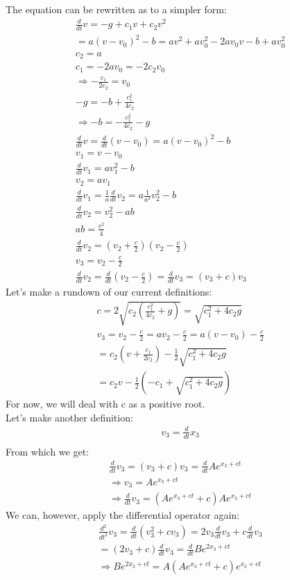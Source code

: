 \documentclass[english,a4paper,oneside,article,9pt]{memoir}
\begin{document}
The equation can be rewritten as to a simpler form:
\begin{align*}
\frac{d}{dt}v=-g+c_1v+c_2v^2\\
=a(v-v_0)^2-b=av^2+av_0^2-2av_0v-b+av_0^2\\
c_2=a\\
c_1=-2av_0=-2c_2v_0\\
\Rightarrow -\frac{c_1}{2c_2}=v_0\\
-g=-b+\frac{c_1^2}{4c_2}\\
\Rightarrow -b=-\frac{c_1^2}{4c_2}-g\\
\frac{d}{dt} v=\frac{d}{dt}(v-v_0)=a(v-v_0)^2-b\\
v_1=v-v_0\\
\frac{d}{dt} v_1=av_1^2-b\\
v_2=av_1\\
\frac{d}{dt} v_1=\frac{1}{a}\frac{d}{dt} v_2=a\frac{1}{a^2}v_2^2-b\\
\frac{d}{dt} v_2=v_2^2-ab\\
ab=\frac{c^2}{4}\\
\frac{d}{dt} v_2=(v_2+\frac{c}{2})(v_2-\frac{c}{2})\\
v_3=v_2-\frac{c}{2}\\
\frac{d}{dt} v_2=\frac{d}{dt}(v_2-\frac{c}{2})=\frac{d}{dt} v_3=(v_3+c)v_3
\end{align*}
Let's make a rundown of our current definitions:
\begin{align*}
c=2\sqrt{c_2(\frac{c_1^2}{4c_2}+g)}=\sqrt{c_1^2+4c_2g}\\
v_3=v_2-\frac{c}{2}=av_2-\frac{c}{2}=a(v-v_0)-\frac{c}{2}\\
=c_2(v+\frac{c_1}{2c_2})-\frac{1}{2}\sqrt{c_1^2+4c_2g}\\
=c_2v-\frac{1}{2}(-c_1+\sqrt{c_1^2+4c_2g})
\end{align*}
For now, we will deal with c as a positive root.\\
Let's make another definition:
\begin{align*}
v_3=\frac{d}{dt}x_3\tag{$x_3$ is transformed position}\\
\end{align*}
From which we get:
\begin{align*}
\frac{d}{dt} v_3=(v_3+c)v_3=\frac{d}{dt}Ae^{x_3+ct}\\
\Rightarrow v_3=Ae^{x_3+ct}\\
\Rightarrow \frac{d}{dt} v_3=(Ae^{x_3+ct}+c)Ae^{x_3+ct}
\end{align*}
We can, however, apply the differential operator again:
\begin{align*}
\frac{d^2}{dt^2}v_3=\frac{d}{dt}(v_3^2+cv_3)=2v_3\frac{d}{dt} v_3+c\frac{d}{dt} v_3\\
=(2v_3+c)\frac{d}{dt} v_3=\frac{d}{dt}Be^{2x_3+ct}\\
\Rightarrow Be^{2x_3+ct}=A(Ae^{x_3+ct}+c)e^{x_3+ct}
\end{align*}
\end{document}
